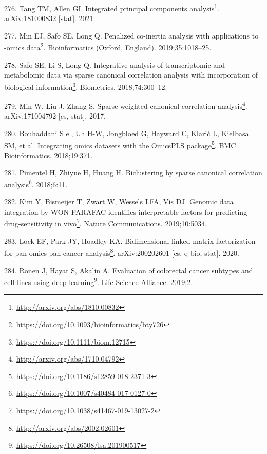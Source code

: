 \documentclass[
  a4paper,
]{book}
\DeclareRobustCommand{\href}[2]{#2\footnote{\url{#1}}}
\newlength{\cslhangindent}
\newlength{\cslentryspacingunit} %
\newenvironment{CSLReferences}[2] %
 {%
  \setlength{\parindent}{0pt}
  \ifodd #1
  \let\oldpar\par
  \def\par{\hangindent=\cslhangindent\oldpar}
  \fi
  \setlength{\parskip}{#2\cslentryspacingunit}
 }%
 {}
\begin{document}
\begin{CSLReferences}{0}{0}
\leavevmode{}%
276. Tang TM, Allen GI. \href{http://arxiv.org/abs/1810.00832}{Integrated principal components analysis}. arXiv:181000832 {[}stat{]}. 2021.

\leavevmode{}%
277. Min EJ, Safo SE, Long Q. \href{https://doi.org/10.1093/bioinformatics/bty726}{Penalized co-inertia analysis with applications to -omics data}. Bioinformatics (Oxford, England). 2019;35:1018--25.

\leavevmode{}%
278. Safo SE, Li S, Long Q. \href{https://doi.org/10.1111/biom.12715}{Integrative analysis of transcriptomic and metabolomic data via sparse canonical correlation analysis with incorporation of biological information}. Biometrics. 2018;74:300--12.

\leavevmode{}%
279. Min W, Liu J, Zhang S. \href{http://arxiv.org/abs/1710.04792}{Sparse weighted canonical correlation analysis}. arXiv:171004792 {[}cs, stat{]}. 2017.

\leavevmode{}%
280. Bouhaddani S el, Uh H-W, Jongbloed G, Hayward C, Klarić L, Kiełbasa SM, et al. \href{https://doi.org/10.1186/s12859-018-2371-3}{Integrating omics datasets with the OmicsPLS package}. BMC Bioinformatics. 2018;19:371.

\leavevmode{}%
281. Pimentel H, Zhiyue H, Huang H. \href{https://doi.org/10.1007/s40484-017-0127-0}{Biclustering by sparse canonical correlation analysis}. 2018;6:11.

\leavevmode{}%
282. Kim Y, Bismeijer T, Zwart W, Wessels LFA, Vis DJ. \href{https://doi.org/10.1038/s41467-019-13027-2}{Genomic data integration by WON-PARAFAC identifies interpretable factors for predicting drug-sensitivity in vivo}. Nature Communications. 2019;10:5034.

\leavevmode{}%
283. Lock EF, Park JY, Hoadley KA. \href{http://arxiv.org/abs/2002.02601}{Bidimensional linked matrix factorization for pan-omics pan-cancer analysis}. arXiv:200202601 {[}cs, q-bio, stat{]}. 2020.

\leavevmode{}%
284. Ronen J, Hayat S, Akalin A. \href{https://doi.org/10.26508/lsa.201900517}{Evaluation of colorectal cancer subtypes and cell lines using deep learning}. Life Science Alliance. 2019;2.


\end{CSLReferences}
\end{document}
